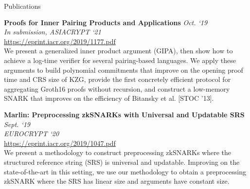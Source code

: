 \documentclass{cv}
\begin{document}
\begin{rSection}{Publications}

\textbf{Proofs for Inner Pairing Products and Applications} \hfill \emph{Oct. `19} \\
\emph{In submission, ASIACRYPT `21} \\
\url{https://eprint.iacr.org/2019/1177.pdf} \\
{\small We present a generalized inner product argument (GIPA), then show how to achieve a log-time verifier for several pairing-based languages. We apply these arguments to build polynomial commitments that improve on the opening proof time and CRS size of KZG, provide the first concretely efficient protocol for aggregating Groth16 proofs without recursion, and construct a low-memory SNARK that improves on the efficiency of Bitansky et al. [STOC '13].}

\textbf{Marlin: Preprocessing zkSNARKs with Universal and Updatable SRS} \hfill \emph{Sept. `19} \\
\emph{EUROCRYPT `20} \\
\url{https://eprint.iacr.org/2019/1047.pdf} \\
{\small We present a methodology to construct preprocessing zkSNARKs where the structured reference string (SRS) is universal and updatable. Improving on the state-of-the-art in this setting, we use our methodology to obtain a preprocessing zkSNARK where the SRS has linear size and arguments have constant size.}

\end{rSection}

\end{document}
